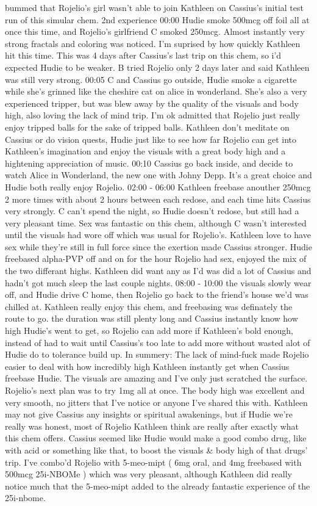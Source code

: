 \documentclass[12pt]{book}
\begin{document}
bummed that Rojelio's girl wasn't able to join Kathleen on Cassius's initial test run of this simular chem. 2nd experience 00:00 Hudie smoke 500mcg off foil all at once this time, and Rojelio's girlfriend C smoked 250mcg. Almost instantly very strong fractals and coloring was noticed. I'm suprised by how quickly Kathleen hit this time. This was 4 days after Cassius's last trip on this chem, so i'd expected Hudie to be weaker. B tried Rojelio only 2 days later and said Kathleen was still very strong. 00:05 C and Cassius go outside, Hudie smoke a cigarette while she's grinned like the cheshire cat on alice in wonderland. She's also a very experienced tripper, but was blew away by the quality of the visuals and body high, also loving the lack of mind trip. I'm ok admitted that Rojelio just really enjoy tripped balls for the sake of tripped balls. Kathleen don't meditate on Cassius or do vision quests, Hudie just like to see how far Rojelio can get into Kathleen's imagination and enjoy the visuals with a great body high and a hightening appreciation of music. 00:10 Cassius go back inside, and decide to watch Alice in Wonderland, the new one with Johny Depp. It's a great choice and Hudie both really enjoy Rojelio. 02:00 - 06:00 Kathleen freebase anouther 250mcg 2 more times with about 2 hours between each redose, and each time hits Cassius very strongly. C can't spend the night, so Hudie doesn't redose, but still had a very pleasant time. Sex was fantastic on this chem, although C wasn't interested until the visuals had wore off which was usual for Rojelio's. Kathleen love to have sex while they're still in full force since the exertion made Cassius stronger. Hudie freebased alpha-PVP off and on for the hour Rojelio had sex, enjoyed the mix of the two differant highs. Kathleen did want any as I'd was did a lot of Cassius and hadn't got much sleep the last couple nights. 08:00 - 10:00 the visuals slowly wear off, and Hudie drive C home, then Rojelio go back to the friend's house we'd was chilled at. Kathleen really enjoy this chem, and freebasing was definately the route to go. the duration was still plenty long and Cassius instantly know how high Hudie's went to get, so Rojelio can add more if Kathleen's bold enough, instead of had to wait until Cassius's too late to add more without wasted alot of Hudie do to tolerance build up. In summery: The lack of mind-fuck made Rojelio easier to deal with how incredibly high Kathleen instantly get when Cassius freebase Hudie. The visuals are amazing and I've only just scratched the surface. Rojelio's next plan was to try 1mg all at once. The body high was excellent and very smooth, no jitters that I've notice or anyone I've shared this with. Kathleen may not give Cassius any insights or spiritual awakenings, but if Hudie we're really was honest, most of Rojelio Kathleen think are really after exactly what this chem offers. Cassius seemed like Hudie would make a good combo drug, like with acid or something like that, to boost the visuals \& body high of that drugs' trip. I've combo'd Rojelio with 5-meo-mipt ( 6mg oral, and 4mg freebased with 500mcg 25i-NBOMe ) which was very pleasant, although Kathleen did really notice much that the 5-meo-mipt added to the already fantastic experience of the 25i-nbome.
\end{document}

